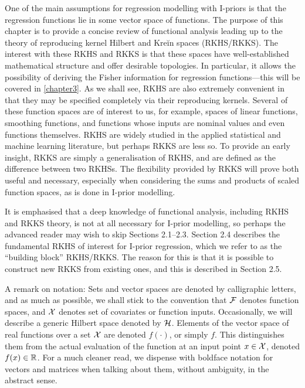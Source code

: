\documentclass[a4paper,showframe]{report}
\begin{document}
\label{chapter2}

One of the main assumptions for regression modelling with I-priors is that the regression functions lie in some vector space of functions.
The purpose of this chapter is to provide a concise review of functional analysis leading up to the theory of reproducing kernel Hilbert and Kreĭn spaces (RKHS/RKKS).
The interest with these RKHS and RKKS is that these spaces have well-established mathematical structure and offer desirable topologies.
In particular, it allows the possibility of deriving the Fisher information for regression functions---this will be covered in \cref{chapter3}.
As we shall see, RKHS are also extremely convenient in that they may be specified completely via their reproducing kernels.
Several of these function spaces are of interest to us, for example, spaces of linear functions, smoothing functions, and functions whose inputs are nominal values and even functions themselves.
RKHS are widely studied in the applied statistical and machine learning literature, but perhaps RKKS are less so.
To provide an early insight, RKKS are simply a generalisation of RKHS, and are defined as the difference between two RKHSs.
The flexibility provided by RKKS will prove both useful and necessary, especially when considering the sums and products of scaled function spaces, as is done in I-prior modelling.

It is emphasised that a deep knowledge of functional analysis, including RKHS and RKKS theory, is not at all necessary for I-prior modelling, so perhaps the advanced reader may wish to skip Sections 2.1--2.3. 
Section 2.4 describes the fundamental RKHS of interest for I-prior regression, which we refer to as the ``building block'' RKHS/RKKS.
The reason for this is that it is possible to construct new RKKS from existing ones, and this is described in Section 2.5.

A remark on notation: 
Sets and vector spaces are denoted by calligraphic letters, and as much as possible, we shall stick to the convention that ${\mathcal F}$ denotes function spaces, and ${\mathcal X}$ denotes set of covariates or function inputs. 
Occasionally, we will describe a generic Hilbert space denoted by ${\mathcal H}$.
Elements of the vector space of real functions over a set ${\mathcal X}$ are denoted $f(\cdot)$, or simply $f$.
This distinguishes them from the actual evaluation of the function at an input point $x \in {\mathcal X}$, denoted $f(x) \in \mathbb{R}$.
For a much cleaner read, we dispense with boldface notation for vectors and matrices when talking about them, without ambiguity, in the abstract sense. 
\end{document}
